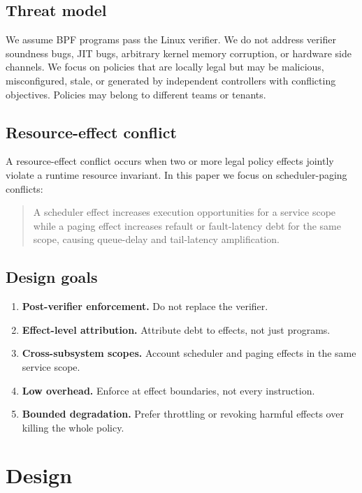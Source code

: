 \documentclass[letterpaper,twocolumn,10pt]{article}
\begin{document}
\subsection{Threat model}

We assume BPF programs pass the Linux verifier. We do not address verifier soundness bugs, JIT bugs, arbitrary kernel memory corruption, or hardware side channels. We focus on policies that are locally legal but may be malicious, misconfigured, stale, or generated by independent controllers with conflicting objectives. Policies may belong to different teams or tenants.

\subsection{Resource-effect conflict}

A resource-effect conflict occurs when two or more legal policy effects jointly violate a runtime resource invariant. In this paper we focus on scheduler-paging conflicts:

\begin{quote}
A scheduler effect increases execution opportunities for a service scope while a paging effect increases refault or fault-latency debt for the same scope, causing queue-delay and tail-latency amplification.
\end{quote}

\subsection{Design goals}

\begin{enumerate}[leftmargin=*]
    \item \textbf{Post-verifier enforcement.} Do not replace the verifier.
    \item \textbf{Effect-level attribution.} Attribute debt to effects, not just programs.
    \item \textbf{Cross-subsystem scopes.} Account scheduler and paging effects in the same service scope.
    \item \textbf{Low overhead.} Enforce at effect boundaries, not every instruction.
    \item \textbf{Bounded degradation.} Prefer throttling or revoking harmful effects over killing the whole policy.
\end{enumerate}

\section{Design}
\end{document}
